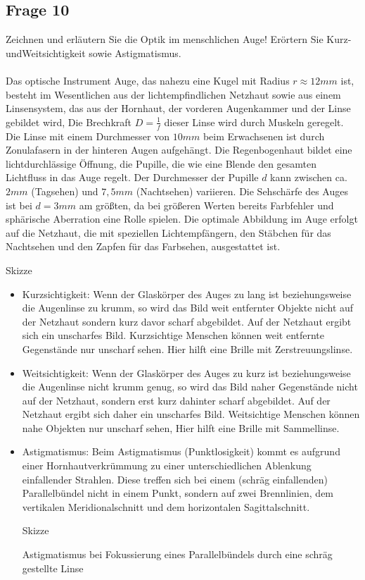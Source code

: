 \documentclass[a4paper,10pt]{scrartcl}
\begin{document}
	\subsection{Frage 10}
		Zeichnen und erläutern Sie die Optik im menschlichen Auge! Erörtern Sie Kurz- undWeitsichtigkeit sowie Astigmatismus.
		\\
		\\
		Das optische Instrument Auge, das nahezu eine Kugel mit Radius $r\approx12 mm$ ist, besteht im Wesentlichen aus der lichtempfindlichen Netzhaut sowie aus einem Linsensystem, das aus der Hornhaut, der vorderen Augenkammer und der Linse gebildet wird, Die Brechkraft $D=\frac{1}{f}$ dieser Linse wird durch Muskeln geregelt. Die Linse mit einem Durchmesser von $10 mm$ beim Erwachsenen ist durch Zonulafasern in der hinteren Augen aufgehängt. Die Regenbogenhaut bildet eine lichtdurchlässige Öffnung, die Pupille, die wie eine Blende den gesamten Lichtfluss in das Auge regelt. Der Durchmesser der Pupille $d$ kann zwischen ca. $2 mm$ (Tagsehen) und $7,5 mm$ (Nachtsehen) variieren. Die Sehschärfe des Auges ist bei $d=3 mm$ am größten, da bei größeren Werten bereits Farbfehler und sphärische Aberration eine Rolle spielen. Die optimale Abbildung im Auge erfolgt auf die Netzhaut, die mit speziellen Lichtempfängern, den Stäbchen für das Nachtsehen und den Zapfen für das Farbsehen, ausgestattet ist.
		
			\begin{center}
			Skizze
			\end{center}
	
		\begin{itemize}
			\item Kurzsichtigkeit: Wenn der Glaskörper des Auges zu lang ist beziehungsweise die Augenlinse zu krumm, so wird das Bild weit entfernter Objekte nicht auf der Netzhaut sondern kurz davor scharf abgebildet. Auf der Netzhaut ergibt sich ein unscharfes Bild. Kurzsichtige Menschen können weit entfernte Gegenstände nur unscharf sehen. Hier hilft eine Brille mit Zerstreuungslinse.
			\item Weitsichtigkeit: Wenn der Glaskörper des Auges zu kurz ist beziehungsweise die Augenlinse nicht krumm genug, so wird das Bild naher Gegenstände nicht auf der Netzhaut, sondern erst kurz dahinter scharf abgebildet. Auf der Netzhaut ergibt sich daher ein unscharfes Bild. Weitsichtige Menschen können nahe Objekten nur unscharf sehen, Hier hilft eine Brille mit Sammellinse.
			\item Astigmatismus: Beim Astigmatismus (Punktlosigkeit) kommt es aufgrund einer Hornhautverkrümmung zu einer unterschiedlichen Ablenkung einfallender Strahlen. Diese treffen sich bei einem (schräg einfallenden) Parallelbündel nicht in einem Punkt, sondern auf zwei Brennlinien, dem vertikalen Meridionalschnitt und dem horizontalen Sagittalschnitt.
			
				\begin{center}
				Skizze
				\end{center}
	
				Astigmatismus bei Fokussierung eines Parallelbündels durch eine schräg gestellte Linse
		\end{itemize}
\end{document}
